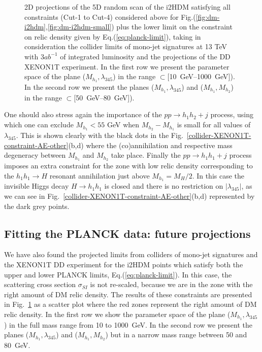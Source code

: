 \documentclass[12pt,a4paper]{article}
\begin{document}
\begin{figure}[htb]
\caption{2D projections of the 5D random scan of the i2HDM satisfying all constraints (Cut-1 to Cut-4) considered above for Fig.(\ref{fig:dm-i2hdm},\ref{fig:dm-i2hdm-small}) plus the lower limit on the constraint on relic density given by Eq.(\ref{eq:planck-limit}), taking in consideration the collider limits of mono-jet signatures at 13 TeV with 3$ab^{-1}$ of integrated luminosity and the projections of the DD XENON1T experiment. In the first row we present the parameter space of the plane ($M_{h_1},\lambda_{345}$) in the range $\subset $[10~GeV--1000~GeV]). In the second row we present the planes ($M_{h_1},\lambda_{345}$) and ($M_{h_1},M_{h_2}$) in the range $ \subset $[50~GeV--80~GeV]).} \label{fig:dm-i2hdm-LHC-DD}
\end{figure}

One should also stress again the  importance of the   $pp \to h_1h_2+j$ process,
using which  one can exclude $M_{h_1}<55$ GeV when  $M_{h_2}-M_{h_1}$ is small
for all values of $\lambda_{345}$.
 This is shown clearly  with the black dots in the Fig.~\ref{collider-XENON1T-constraint-AE-other}(b,d) where the (co)annihilation and respective mass degeneracy between $M_{h_1}$ and $M_{h_2}$ take place. Finally the $pp \to h_1 h_1 + j$ process imposes an extra constraint for the zone with low relic density corresponding to the $h_1h_1 \to H$ resonant annihilation just above $M_{h_1}=M_H/2$. In this case the invisible Higgs decay $H \to h_1h_1$ is closed and there is no restriction on $|\lambda_{345}|$, as we can see in Fig.~\ref{collider-XENON1T-constraint-AE-other}(b,d) represented by the dark grey points.

\subsection{Fitting the PLANCK data: future projections}

We have also found the  projected limits from colliders of mono-jet signatures  and the XENON1T DD experiment for the i2HDM points which satisfy both the upper and lower PLANCK limits, Eq.(\ref{eq:planck-limit}). In this case, the scattering cross section $\sigma_{SI}$ is not re-scaled, because we are in the zone with the right amount of DM relic density. The results of these constraints are presented in Fig.~\ref{fig:dm-i2hdm-LHC-DD} as a scatter plot where the red zones represent the right amount of DM relic density. In the first row we show the parameter space of the plane ($M_{h_1},\lambda_{345}$) in the full
mass range from 10 to 1000~GeV. In the second row we present the planes ($M_{h_1},\lambda_{345}$) and ($M_{h_1},M_{h_2}$) but in a narrow mass range 
between 50 and 80~GeV.
%
\end{document}
